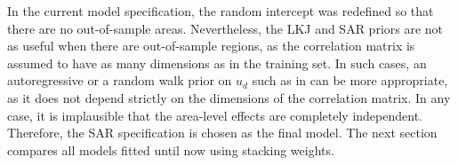 In the current model specification, the random intercept was redefined so that there are no out-of-sample areas.
Nevertheless, the LKJ and SAR priors are not as useful when there are out-of-sample regions, as the correlation matrix is assumed to have as many dimensions as in the training set.
In such cases, an autoregressive or a random walk prior on $u_d$ such as in \cite{gao_improving_2021} can be more appropriate, as it does not depend strictly on the dimensions of the correlation matrix.
In any case, it is implausible that the area-level effects are completely independent.
Therefore, the SAR specification is chosen as the final model.
The next section compares all models fitted until now using stacking weights.













